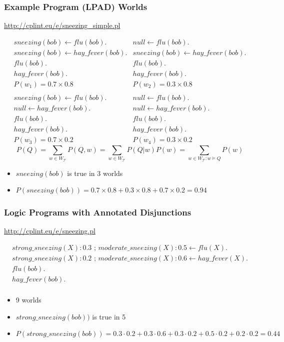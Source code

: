 \documentclass[trans]{beamer}
\newcommand\orh{\mbox{ ; }}
\begin{document}
\begin{frame}
  \frametitle{Example Program (LPAD) Worlds}
  \url{http://cplint.eu/e/sneezing_simple.pl}
\begin{footnotesize}
$$ \begin{array}{ll}
 sneezing(bob)\leftarrow \mathit{flu}(bob).& null\leftarrow \mathit{flu}(bob).\\
 sneezing(bob)\leftarrow hay\_\mathit{fever}(bob).& sneezing(bob)\leftarrow hay\_\mathit{fever}(bob).\\
\mathit{flu}(bob).&\mathit{flu}(bob).\\
 hay\_\mathit{fever}(bob).&hay\_\mathit{fever}(bob).\\
P(w_1)=0.7\times 0.8 &P(w_2)=0.3\times 0.8\\
\\
 sneezing(bob)\leftarrow \mathit{flu}(bob).& null\leftarrow \mathit{flu}(bob).\\
 null\leftarrow hay\_\mathit{fever}(bob).& null\leftarrow hay\_\mathit{fever}(bob).\\
\mathit{flu}(bob).&\mathit{flu}(bob).\\
 hay\_\mathit{fever}(bob). &hay\_\mathit{fever}(bob).\\
P(w_3)=0.7\times 0.2 &P(w_4)=0.3\times 0.2
 \end{array}$$
\begin{equation*}
\label{ds}
P(Q)=\sum_{w\in W_\mathcal{T}}P(Q,w)=\sum_{w \in W_\mathcal{T}}P(Q|w)P(w)=\sum_{w\in W_\mathcal{T}: w\models Q}P(w)
\end{equation*}
\end{footnotesize}
\begin{itemize}
\item $sneezing(bob)$ is true in 3 worlds
\item $P(sneezing(bob))=0.7\times 0.8+0.3\times 0.8+0.7\times 0.2=0.94$
\end{itemize}
\end{frame}

\begin{frame}
  \frametitle{Logic Programs with Annotated Disjunctions}
  \url{http://cplint.eu/e/sneezing.pl}
\begin{footnotesize}
 $$\begin{array}{l}
strong\_sneezing(X):0.3\orh moderate\_sneezing(X):0.5\leftarrow \mathit{flu}(X).\\
strong\_sneezing(X):0.2\orh moderate\_sneezing(X):0.6\leftarrow hay\_\mathit{fever}(X).\\
\mathit{flu}(bob).\\
hay\_\mathit{fever}(bob).\\
 \end{array}$$
\end{footnotesize}
\begin{itemize}
\item 9 worlds
\item $strong\_sneezing(bob))$ is true in 5
\item $P(strong\_sneezing(bob))=0.3\cdot 0.2+0.3\cdot 0.6+0.3\cdot 0.2+0.5\cdot 0.2+0.2\cdot 0.2=0.44$
\end{itemize}
\end{frame}
\end{document}
